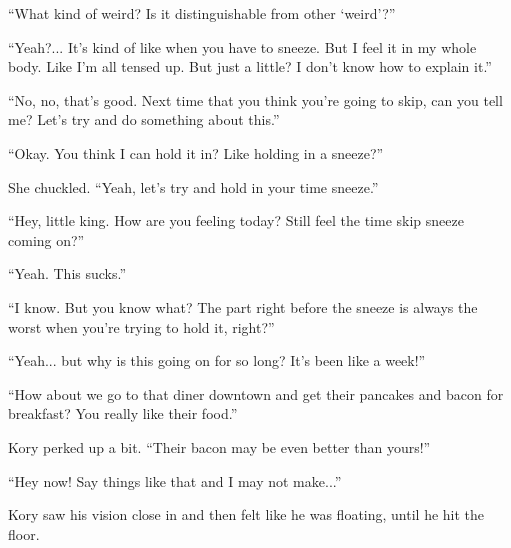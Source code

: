 ``What kind of weird? Is it distinguishable from other `weird'?''

``Yeah?... It's kind of like when you have to sneeze. But I feel it in my whole body. Like I'm all tensed up. But just a little? I don't know how to explain it.''

``No, no, that's good. Next time that you think you're going to skip, can you tell me? Let's try and do something about this.''

``Okay. You think I can hold it in? Like holding in a sneeze?''

She chuckled. ``Yeah, let's try and hold in your time sneeze.''

\line


``Hey, little king. How are you feeling today? Still feel the time skip sneeze coming on?''

``Yeah. This sucks.''

``I know. But you know what? The part right before the sneeze is always the worst when you're trying to hold it, right?''

``Yeah... but why is this going on for so long? It's been like a week!''

``How about we go to that diner downtown and get their pancakes and bacon for breakfast? You really like their food.''

Kory perked up a bit. ``Their bacon may be even better than yours!''

``Hey now! Say things like that and I may not make...''

Kory saw his vision close in and then felt like he was floating, until he hit the floor.

